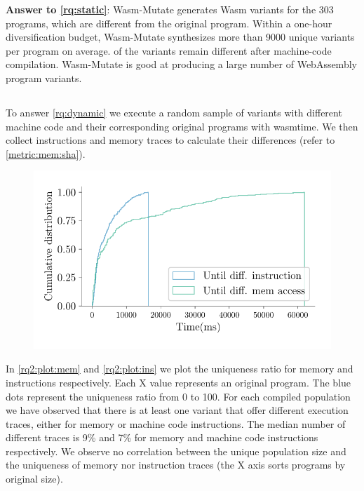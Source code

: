 \documentclass[sigplan,screen]{acmart}
\newcommand{\tool}{{\sc Wasm-Mutate}\xspace}
\newcommand{\wasm}{Wasm\xspace}
\newcommand{\Wasm}{WebAssembly\xspace}
\begin{document}
\begin{tcolorbox}[boxrule=1pt,arc=.3em,boxsep=-1.3mm]
  \textbf{Answer to \ref{rq:static}}: \tool generates \wasm variants for the 303 programs, which are different from the original program. 
  Within a one-hour diversification budget, \tool synthesizes more than 9000 unique  variants per program on average. 
  \preserved of the variants remain different after machine-code compilation.
  \tool is good at producing a large number of \Wasm program variants.
\end{tcolorbox}


\subsection{\rqdynamic}

To answer \ref{rq:dynamic} we execute a random sample of variants with different machine code and their corresponding original programs with wasmtime.
We then collect instructions and memory traces to calculate their differences (refer to \autoref{metric:mem:sha}).

\begin{figure}
    \centering
    \includegraphics[width=\linewidth]{plots/rq2/oracle.cumulative.pdf}
    \caption{}
  \label{rq2:plot:mem}
\end{figure}



\newcommand{\memratio}{9\%\xspace}
\newcommand{\insratio}{7\%\xspace}

In \autoref{rq2:plot:mem} and \autoref{rq2:plot:ins} we plot the uniqueness ratio for memory and instructions respectively.
Each X value represents an original program.
The blue dots represent the uniqueness ratio from 0 to 100.
For each compiled population we have observed that there is at least one variant that offer different execution traces, either for memory or machine code instructions.
The median number of different traces is \memratio and \insratio for memory and machine code instructions respectively.
We observe no correlation between the unique population size and the uniqueness of memory nor instruction traces (the X axis sorts programs by original size).
\end{document}
